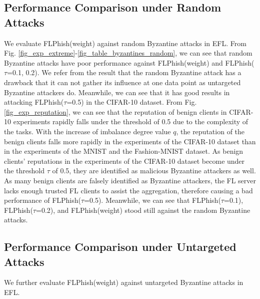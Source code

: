 \documentclass[journal]{IEEEtran}
\begin{document}
  \subsection{Performance Comparison under Random Attacks}
  \par We evaluate FLPhish(weight) against random Byzantine attacks in EFL. From Fig. \ref{fig_exp_extreme}-\ref{fig_table_byzantines_random}, we can see that random Byzantine attacks have poor performance against FLPhish(weight) and FLPhish($\tau$=0.1, 0.2). We refer from the result that the random Byzantine attack has a drawback that it can not gather its influence at one data point as untargeted Byzantine attackers do. Meanwhile, we can see that it has good results in attacking FLPhish($\tau$=0.5) in the CIFAR-10 dataset. From Fig. \ref{fig_exp_reputation}, we can see that the reputation of benign clients in CIFAR-10 experiments rapidly falls under the threshold of 0.5 due to the complexity of the tasks. With the increase of imbalance degree value $q$, the reputation of the benign clients falls more rapidly in the experiments of the CIFAR-10 dataset than in the experiments of the MNIST and the Fashion-MNIST dataset. As benign clients' reputations in the experiments of the CIFAR-10 dataset become under the threshold $\tau$ of 0.5, they are identified as malicious Byzantine attackers as well. As many benign clients are falsely identified as Byzantine attackers, the FL server lacks enough trusted FL clients to assist the aggregation, therefore causing a bad performance of FLPhish($\tau$=0.5). Meanwhile, we can see that FLPhish($\tau$=0.1), FLPhish($\tau$=0.2), and FLPhish(weight) stood still against the random Byzantine attacks.








  \subsection{{Performance Comparison under Untargeted Attacks}} We further evaluate FLPhish(weight) against untargeted Byzantine attacks in EFL.
  
\end{document}
